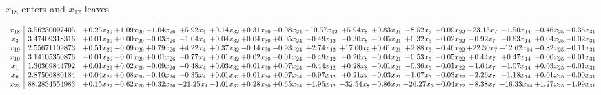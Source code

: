 \documentclass[9pt]{article}
\begin{document}
 $ x_{18} $ enters and $ x_{12} $ leaves 

 \[\begin{array}{c| c c@{\hskip 2pt} c@{\hskip 2pt} c@{\hskip 2pt} c@{\hskip 2pt} c@{\hskip 2pt} c@{\hskip 2pt} c@{\hskip 2pt} c@{\hskip 2pt} c@{\hskip 2pt} c@{\hskip 2pt} c@{\hskip 2pt} c@{\hskip 2pt} c@{\hskip 2pt} c@{\hskip 2pt} c@{\hskip 2pt} c@{\hskip 2pt} }
 x_{18}   &  3.56230097405 & +  0.25 x_{29} & +  1.09 x_{20} & -1.04 x_{26} & +  5.92 x_{4} & +  0.14 x_{32} & +  0.31 x_{30} & -0.08 x_{24} & -10.57 x_{12} & +  5.94 x_{8} & +  0.83 x_{21} & -8.52 x_{5} & +  0.09 x_{22} & -23.13 x_{7} & -1.50 x_{14} & -0.46 x_{25} & +  0.36 x_{31}\\
 x_{3}   &  3.47409318316 & +  0.01 x_{29} & +  0.00 x_{20} & -0.03 x_{26} & -1.04 x_{4} & +  0.04 x_{32} & +  0.04 x_{30} & +  0.05 x_{24} & -0.49 x_{12} & -0.30 x_{8} & -0.05 x_{21} & +  0.32 x_{5} & -0.02 x_{22} & -0.92 x_{7} & -0.63 x_{14} & +  0.04 x_{25} & +  0.02 x_{31}\\
 x_{19}   &  2.55671109873 & +  0.51 x_{29} & -0.09 x_{20} & +  0.79 x_{26} & +  4.22 x_{4} & +  0.37 x_{32} & -0.14 x_{30} & -0.93 x_{24} & +  2.74 x_{12} & + 17.00 x_{8} & +  0.61 x_{21} & +  2.88 x_{5} & -0.46 x_{22} & + 22.30 x_{7} & + 12.62 x_{14} & -0.82 x_{25} & +  0.11 x_{31}\\
 x_{10}   &  3.14105350876 & -0.01 x_{29} & -0.01 x_{20} & +  0.01 x_{26} & -0.77 x_{4} & +  0.01 x_{32} & +  0.02 x_{30} & -0.01 x_{24} & -0.49 x_{12} & -0.20 x_{8} & -0.04 x_{21} & -0.53 x_{5} & -0.05 x_{22} & +  0.44 x_{7} & +  0.47 x_{14} & -0.00 x_{25} & -0.01 x_{31}\\
 x_{1}   &  1.30369844792 & +  0.01 x_{29} & +  0.02 x_{20} & -0.09 x_{26} & -0.48 x_{4} & +  0.03 x_{32} & +  0.01 x_{30} & +  0.07 x_{24} & -0.44 x_{12} & +  0.28 x_{8} & -0.01 x_{21} & -0.36 x_{5} & -0.01 x_{22} & -1.64 x_{7} & -1.07 x_{14} & +  0.03 x_{25} & -0.01 x_{31}\\
 x_{6}   &  2.87506880184 & +  0.04 x_{29} & +  0.08 x_{20} & -0.10 x_{26} & -0.35 x_{4} & +  0.01 x_{32} & +  0.01 x_{30} & +  0.07 x_{24} & -0.97 x_{12} & +  0.21 x_{8} & -0.03 x_{21} & -1.07 x_{5} & -0.03 x_{22} & -2.26 x_{7} & -1.18 x_{14} & +  0.01 x_{25} & +  0.00 x_{31}\\
 x_{23}   &  88.2834554983 & +  0.15 x_{29} & -0.62 x_{20} & +  0.32 x_{26} & -21.25 x_{4} & -1.01 x_{32} & +  0.28 x_{30} & +  0.65 x_{24} & +  1.95 x_{12} & -32.54 x_{8} & -0.86 x_{21} & -26.27 x_{5} & +  0.04 x_{22} & -8.38 x_{7} & + 16.33 x_{14} & +  1.27 x_{25} & -1.99 x_{31}\\

\end{array}\]
\end{document}
